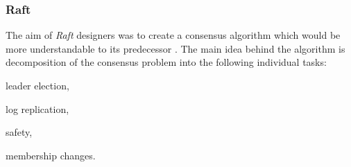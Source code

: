 









\subsubsection{Raft}
The aim of \emph{Raft} designers was to create a consensus algorithm which would be more understandable to its predecessor \cite{ongaro2014search}. 
The main idea behind the algorithm is decomposition of the consensus problem into the following individual tasks:
\begin{enumerate*}
\item leader election,
\item log replication,
\item safety,
\item membership changes.
\end{enumerate*} 
 
